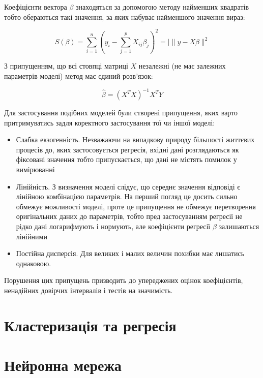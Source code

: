 Коефіцієнти вектора $\beta$ знаходяться за допомогою методу найменших квадратів тобто обераються такі значення, за яких набуває найменшого значення вираз: 

$$ S(\beta) = \sum_{i = 1}^{n} ( y_i - \sum_{j = 1}^{p} X_{ij} \beta_j )^2 = |\| y - X\beta \|^2 $$

З припущенням, що всі стовпці матриці $X$ незалежні (не має залежних параметрів моделі) метод має єдиний розв'язок:

$$\hat{\beta} = (X^T X)^{-1} X^T Y$$

Для застосування подібних моделей були створені припущення, яких варто притримуватись задля коректного застосування тої чи іншої моделі:

\begin{itemize}
    \item Слабка екзогенність. Незважаючи на випадкову природу більшості життєвих процесів до, яких застосовується регресія, вхідні дані розглядаються як фіксовані значення тобто припускається, що дані не містять помилок у вимірюванні

    \item Лінійність. З визначення моделі слідує, що середнє значення відповіді є лінійною комбінацією параметрів. На перший погляд це досить сильно обмежує можливості моделі, проте це припущення не обмежує перетворення оригінальних даних до параметрів, тобто пред застосуванням регресії не рідко дані логарифмують і нормують, але коефіцієнти регресії $\beta$ залишаються лінійними

    \item  Постійна дисперсія. Для великих і малих величин похибки має лишатись однаковою.
\end{itemize}

Порушення цих припущень призводить до упереджених оцінок коефіцієнтів, ненадійних довірчих інтервалів і тестів на значимість.


\section{Кластеризація та регресія}


\section{Нейронна мережа}